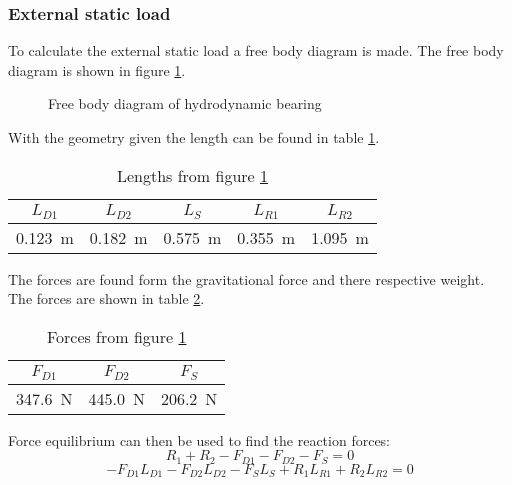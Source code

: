 \clearpage

\subsubsection{External static load}
To calculate the external static load a free body diagram is made. The free body diagram is shown in figure \ref{fig:free_body_diagram}.
\begin{figure}[ht]
    \centering
    
    \caption{Free body diagram of hydrodynamic bearing}
    \label{fig:free_body_diagram}
\end{figure}
With the geometry given the length can be found in table \ref{tab:hydrodynamic_bearing_properties}.
\begin{table}[ht]
    \centering
    \caption{Lengths from figure \ref{fig:free_body_diagram}}
    \label{tab:hydrodynamic_bearing_properties}
    \begin{tabular}{@{}ccccc@{}}
        \toprule
        $L_{D1}$    &   $L_{D2}$    &   $L_S$   &   $L_{R1}$   &   $L_{R2}$   \\ \midrule
        \SI{0.123}{\meter}  &   \SI{0.182}{\meter}  &   \SI{0.575}{\meter}   &   \SI{0.355}{\meter}   &   \SI{1.095}{\meter}   \\ \bottomrule
    \end{tabular}
\end{table}
The forces are found form the gravitational force and there respective weight. The forces are shown in table \ref{tab:hydrodynamic_bearing_forces}.
\begin{table}[ht]
    \centering
    \caption{Forces from figure \ref{fig:free_body_diagram}}
    \label{tab:hydrodynamic_bearing_forces}
    \begin{tabular}{@{}ccc@{}}
        \toprule
        $F_{D1}$    &   $F_{D2}$    &   $F_S$   \\ \midrule
        \SI{347.6}{\newton}  &   \SI{445.0}{\newton}  &   \SI{206.2}{\newton}   \\ \bottomrule
    \end{tabular}
\end{table}
Force equilibrium can then be used to find the reaction forces:
\begin{equation}
    R_1 + R_2 - F_{D1} - F_{D2} - F_S = 0
    \label{eq:vertical_equilibrium}
\end{equation}
\begin{equation}
    -F_{D1} L_{D1} - F_{D2} L_{D2} - F_S L_S + R_1 L_{R1} + R_2 L_{R2} = 0
    \label{eq:moment_equilibrium}
\end{equation}
